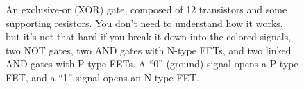 \begin{figure}[ht!]
\begin{center}

\caption{An exclusive-or (XOR) gate, composed of 12 transistors and some supporting resistors. You don't need to understand how it works, but it's not that hard if you break it down into the colored signals, two NOT gates, two AND gates with N-type FETs, and two linked AND gates with P-type FETs. A ``0'' (ground) signal opens a P-type FET, and a ``1'' signal opens an N-type FET.}
\label{fig:xorgate}
\end{center}
\end{figure}

